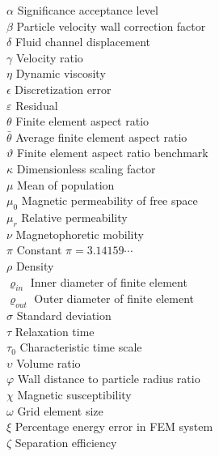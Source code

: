 \begin{tabbing}
 $\alpha$ \> Significance acceptance level \> [$-$] \\[0.5ex] 
 $\beta$ \> Particle velocity wall correction factor \> [$-$] \\[0.5ex] 
 $\delta$ \> Fluid channel displacement \> [m] \\[0.5ex]
 $\gamma$ \> Velocity ratio \> [$-$] \\[0.5ex]
 $\eta$ \> Dynamic viscosity \> [kg/m$\cdot$s] \\[0.5ex] 
 $\epsilon$ \> Discretization error \> [V$\cdot$s/m] \\[0.5ex] 
 $\varepsilon$ \> Residual \> [A/m${^2}$] \\[0.5ex]
 $\theta$ \> Finite element aspect ratio \> [$-$] \\[0.5ex]
 $\bar{\theta}$ \> Average finite element aspect ratio \> [$-$] \\[0.5ex]  
 $\vartheta$ \> Finite element aspect ratio benchmark \> [$-$] \\[0.5ex]
 $\kappa$ \> Dimensionless scaling factor \> [$-$] \\[0.5ex]
 $\mu$ \> Mean of population \> [$\ast$] \\[0.5ex] 
 $\mu_{0}$ \> Magnetic permeability of free space \> [N/A${^2}$] \\[0.5ex] 
 $\mu_{r}$ \> Relative permeability \> [$-$] \\[0.5ex] 
 $\nu$ \> Magnetophoretic mobility  \\[0.5ex]
 $\pi$ \> Constant $\pi=3.14159\cdots$ \> [$-$] \\[0.5ex]
 $\rho$ \> Density \> [kg/m$^{3}$] \\[0.5ex]
 $\varrho_{in}$ \> Inner diameter of finite element \> [m] \\[0.5ex] 
 $\varrho_{out}$ \> Outer diameter of finite element \> [m] \\[0.5ex] 
 $\sigma$ \> Standard deviation \> [$-$] \\[0.5ex] 
 $\tau$ \> Relaxation time \> [s] \\[0.5ex]
 $\tau_{0}$ \> Characteristic time scale \> [s] \\[0.5ex]
 $\upsilon$ \> Volume ratio \> [$-$] \\[0.5ex] 
 $\varphi$ \> Wall distance to particle radius ratio \> [$-$] \\[0.5ex] 
 $\chi$ \> Magnetic susceptibility \> [$-$] \\[0.5ex]
 $\omega$ \> Grid element size \> [m] \\[0.5ex]
 $\xi$ \> Percentage energy error in FEM system \> [$-$] \\[0.5ex]
 $\zeta$ \> Separation efficiency \> [$-$] \\[0.5ex]


\end{tabbing}
